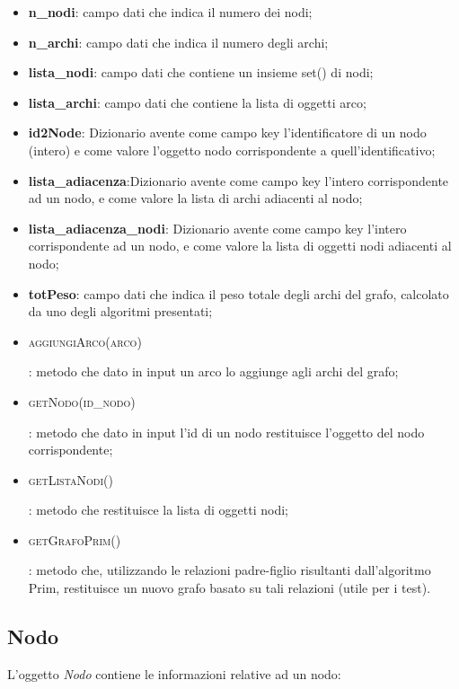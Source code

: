 \begin{itemize}
    \item \textbf{n\_nodi}: campo dati che indica il numero dei nodi;
    \item \textbf{n\_archi}: campo dati che indica il numero degli archi;
    \item \textbf{lista\_nodi}: campo dati che contiene un insieme set() di nodi; 
    \item \textbf{lista\_archi}: campo dati che contiene la lista di oggetti arco;
    \item \textbf{id2Node}: Dizionario avente come campo key l'identificatore di un nodo (intero) e come valore l'oggetto nodo corrispondente a quell'identificativo;
    \item \textbf{lista\_adiacenza}:Dizionario avente come campo key l'intero corrispondente ad un nodo,  e come valore la lista di archi adiacenti al nodo;
    \item \textbf{lista\_adiacenza\_nodi}: Dizionario avente come campo key l'intero corrispondente ad un nodo,  e come valore la lista di oggetti nodi adiacenti al nodo;
    \item \textbf{totPeso}: campo dati che indica il peso totale degli archi del grafo, calcolato da uno degli algoritmi presentati;
    \item \hypertarget{aggiungiarco}{\textsc{aggiungiArco(arco)}}: metodo che dato in input un arco lo aggiunge agli archi del grafo;
    \item \hypertarget{getnodo}{\textsc{getNodo(id\_nodo)}}: metodo che dato in input l'id di un nodo restituisce l'oggetto del nodo corrispondente;
    \item \hypertarget{getlistanodi}{\textsc{getListaNodi()}}: metodo che restituisce la lista di  oggetti nodi;
    \item \hypertarget{getgrafoprim}{\textsc{getGrafoPrim()}}: metodo che, utilizzando le relazioni padre-figlio risultanti dall'algoritmo Prim, restituisce un nuovo grafo basato su tali relazioni (utile per i test).
\end{itemize}


\subsection{Nodo}
\label{Nodo}

L'oggetto \textit{Nodo} contiene le informazioni relative ad un nodo:

